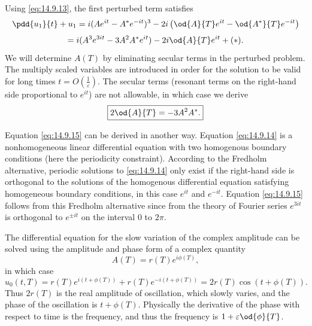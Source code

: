 Using \eqref{eq:14.9.13}, the first perturbed term satisfies
\begin{equation}
\pdd{u_1}{t} + u_1 = i(Ae^{it} - A^*e^{-it})^3 - 2i\left(\od{A}{T}e^{it} - \od{A^*}{T}e^{-it}\right)
\label{eq:14.9.14}
\end{equation}
\[
= i(A^3 e^{3it} - 3A^2A^*e^{it}) - 2i\od{A}{T}e^{it} + (*).
\]
We will determine $A(T)$ by eliminating secular terms in the perturbed problem. The multiply scaled variables are introduced in order for the solution to be valid for long times $t = O(\frac{1}{\varepsilon})$. The secular terms (resonant terms on the right-hand side proportional to $e^{it}$) are not allowable, in which case we derive
\begin{equation}
\boxed{2\od{A}{T} = -3A^2A^*.}
\label{eq:14.9.15}
\end{equation}

Equation \eqref{eq:14.9.15} can be derived in another way. Equation \eqref{eq:14.9.14} is a nonhomogeneous linear differential equation with two homogenous boundary conditions (here the periodicity constraint). According to the Fredholm alternative, periodic solutions to \eqref{eq:14.9.14} only exist if the right-hand side is orthogonal to the solutions of the homogenous differential equation satisfying homogeneous boundary conditions, in this case $e^{it}$ and $e^{-it}$. Equation \eqref{eq:14.9.15} follows from this Fredholm alternative since from the theory of Fourier series $e^{3it}$ is orthogonal to $e^{\pm it}$ on the interval 0 to $2\pi$.

The differential equation for the slow variation of the complex amplitude can be solved using the amplitude and phase form of a complex quantity
\begin{equation}
A(T) = r(T)e^{i\phi(T)},
\label{eq:14.9.16}
\end{equation}
in which case
\[
u_0(t, T) = r(T)e^{i(t + \phi(T))} + r(T)e^{-i(t + \phi(T))} = 2r(T)\cos(t + \phi(T)).
\]
Thus $2r(T)$ is the real amplitude of oscillation, which slowly varies, and the phase of the oscillation is $t + \phi(T)$. Physically the derivative of the phase with respect to time is the frequency, and thus the frequency is $1 + \varepsilon\od{\phi}{T}$.

